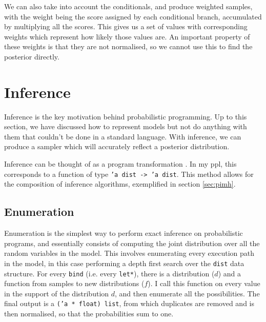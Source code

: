 We can also take into account the conditionals, and produce weighted samples, with the weight being the score assigned by each conditional branch, accumulated by multiplying all the scores. This gives us a set of values with corresponding weights which represent how likely those values are. An important property of these weights is that they are not normalised, so we cannot use this to find the posterior directly. 

\section{Inference} \label{sec:inference}

Inference is the key motivation behind probabilistic programming. Up to this section, we have discussed how to represent models but not do anything with them that couldn't be done in a standard language. With inference, we can produce a sampler which will accurately reflect a posterior distribution.

Inference can be thought of as a program transformation \cite{scibior2015practical} \cite{Zinkov2016ComposingIA}. In my ppl, this corresponds to a function of type \texttt{'a dist -> 'a dist}. This method allows for the composition of inference algorithms, exemplified in section \ref{sec:pimh}.

	
	
	
	
\subsection{Enumeration} \label{sec:enum}
Enumeration is the simplest way to perform exact inference on probabilistic programs, and essentially consists of computing the joint distribution over all the random variables in the model. This involves enumerating every execution path in the model, in this case performing a depth first search over the \texttt{dist} data structure. For every \texttt{bind} (i.e. every \texttt{let*}), there is a distribution ($d$) and a function from samples to new distributions ($f$). I call this function on every value in the support of the distribution $d$, and then enumerate all the possibilities. The final output is a \texttt{('a * float) list}, from which duplicates are removed and is then normalised, so that the probabilities sum to one.
	
